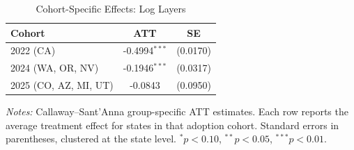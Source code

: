 \begin{table}[htbp]
\centering
\caption{Cohort-Specific Effects: Log Layers}
\label{tab:cohort}
\begin{tabular}{lcc}
\hline\hline
Cohort & ATT & SE \\
\hline
2022 (CA) & -0.4994$^{***}$ & (0.0170) \\
2024 (WA, OR, NV) & -0.1946$^{***}$ & (0.0317) \\
2025 (CO, AZ, MI, UT) & -0.0843 & (0.0950) \\
\hline\hline
\end{tabular}
\begin{tablenotes}[flushleft]
\small
\item \textit{Notes:} Callaway--Sant'Anna group-specific ATT estimates. Each row reports the average treatment effect for states in that adoption cohort. Standard errors in parentheses, clustered at the state level. $^{*}p<0.10$, $^{**}p<0.05$, $^{***}p<0.01$.
\end{tablenotes}
\end{table}

